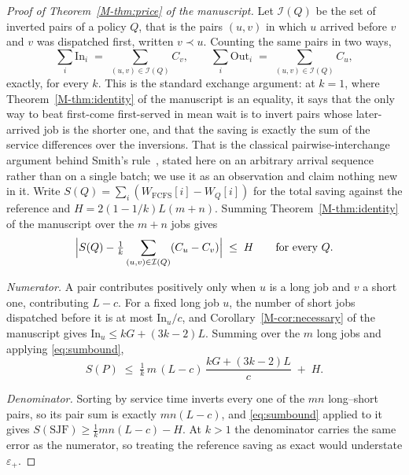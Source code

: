 \documentclass[mathematics,supfile,submit,moreauthors]{Definitions/mdpi}
\begin{document}
\begin{proof}[Proof of Theorem~\ref*{M-thm:price} of the manuscript]
Let $\mathcal{I}(Q)$ be the set of inverted pairs of a policy $Q$, that is the pairs
$(u,v)$ in which $u$ arrived before $v$ and $v$ was dispatched first, written $v \prec u$. Counting the same pairs in two ways,
\[
  \sum_i \mathrm{In}_i \;=\; \sum_{(u,v) \in \mathcal{I}(Q)} C_v ,
  \qquad
  \sum_i \mathrm{Out}_i \;=\; \sum_{(u,v) \in \mathcal{I}(Q)} C_u ,
\]
exactly, for every $k$. This is the standard exchange argument: at $k = 1$,
where Theorem~\ref*{M-thm:identity} of the manuscript is an equality, it says that the only way to
beat first-come first-served in mean wait is to invert pairs whose later-arrived
job is the shorter one, and that the saving is exactly the sum of the service
differences over the inversions. That is the classical pairwise-interchange
argument behind Smith's rule~\cite{smith1956}, stated here on an arbitrary
arrival sequence rather than on a single batch; we use it as an observation and
claim nothing new in it.
Write $S(Q) = \sum_i (W_{\mathrm{FCFS}}[i] -
W_Q[i])$ for the total saving against the reference and
$H = 2(1 - 1/k)L(m+n)$.
Summing Theorem~\ref*{M-thm:identity} of the manuscript over the $m+n$ jobs gives
\begin{equation}
  \Bigl| S(Q) - \tfrac{1}{k} \sum_{(u,v) \in \mathcal{I}(Q)} (C_u - C_v) \Bigr|
  \;\le\; H
  \qquad \text{for every } Q .
  \label{eq:sumbound}
\end{equation}

\emph{Numerator.} A pair contributes positively only when $u$ is a long job and
$v$ a short one, contributing $L - c$. For a fixed long job $u$, the number of
short jobs dispatched before it is at most $\mathrm{In}_u / c$, and
Corollary~\ref*{M-cor:necessary} of the manuscript gives $\mathrm{In}_u \le kG + (3k-2)L$. Summing
over the $m$ long jobs and applying \eqref{eq:sumbound},
\[
  S(P) \;\le\; \tfrac{1}{k}\, m\,(L-c)\,\frac{kG + (3k-2)L}{c}
        \;+\; H .
\]

\emph{Denominator.} Sorting by service time inverts every one of the $mn$
long--short pairs, so its pair sum is exactly $mn(L-c)$, and
\eqref{eq:sumbound} applied to it gives
$S(\mathrm{SJF}) \ge \tfrac{1}{k} m n (L-c) - H$. At $k > 1$ the
denominator carries the same error as the numerator, so treating the reference
saving as exact would understate $\varepsilon_+$.


\end{proof}
\end{document}
